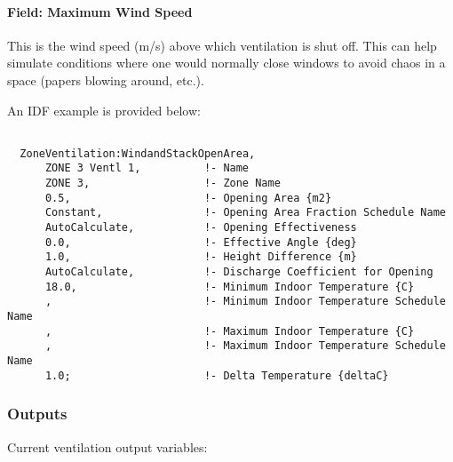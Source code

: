 \paragraph{Field: Maximum Wind Speed}\label{field-maximum-wind-speed-1}

This is the wind speed (m/s) above which ventilation is shut off. This can help simulate conditions where one would normally close windows to avoid chaos in a space (papers blowing around, etc.).

An IDF example is provided below:

\begin{lstlisting}

  ZoneVentilation:WindandStackOpenArea,
      ZONE 3 Ventl 1,          !- Name
      ZONE 3,                  !- Zone Name
      0.5,                     !- Opening Area {m2}
      Constant,                !- Opening Area Fraction Schedule Name
      AutoCalculate,           !- Opening Effectiveness
      0.0,                     !- Effective Angle {deg}
      1.0,                     !- Height Difference {m}
      AutoCalculate,           !- Discharge Coefficient for Opening
      18.0,                    !- Minimum Indoor Temperature {C}
      ,                        !- Minimum Indoor Temperature Schedule Name
      ,                        !- Maximum Indoor Temperature {C}
      ,                        !- Maximum Indoor Temperature Schedule Name
      1.0;                     !- Delta Temperature {deltaC}
\end{lstlisting}

\subsubsection{Outputs}\label{outputs-1-002}

Current ventilation output variables:

